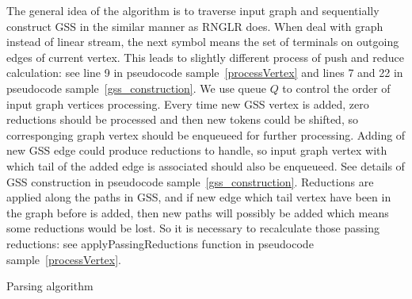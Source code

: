\documentclass{llncs}
\begin{document}
The general idea of the algorithm is to traverse input graph and sequentially construct GSS
in the similar manner as RNGLR does. When deal with graph instead of linear stream,
the next symbol means the set of terminals on outgoing edges of current vertex.
This leads to slightly different process of push and reduce calculation: 
see line 9 in pseudocode sample~\ref{processVertex} and lines 7 and 22 in pseudocode 
sample~\ref{gss_construction}. We use queue $Q$ to control the order of input graph vertices 
processing. Every time new GSS vertex is added, zero reductions should be processed 
and then new tokens could be shifted, so corresponging graph vertex should be 
enqueueed for further processing. Adding of new GSS edge could produce reductions 
to handle, so input graph vertex with which tail of the added edge is associated should 
also be enqueueed. See details of GSS construction in pseudocode sample~\ref{gss_construction}. 
Reductions are applied along the paths in GSS, and if new edge 
which tail vertex have been in the graph before is added, then new paths will possibly 
be added which means some reductions would be lost. So it is necessary to recalculate 
those passing reductions: see applyPassingReductions function in pseudocode sample~\ref{processVertex}.
\begin{algorithm}[!ht]
\begin{algorithmic}[1]
\caption{Parsing algorithm}
\label{parsing}

    \Else
    \EndIf
  \Else
    \EndWhile
    \Else
    \EndIf
  \EndIf
\EndFunction
\end{algorithmic}
\end{algorithm}
\end{document}
